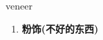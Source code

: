 
\begin{frame}
{\huge veneer}
\begin{center}
\begin{enumerate}\Large
  \item \textbf{粉饰(不好的东西)}
\end{enumerate}
\end{center}
\end{frame}
